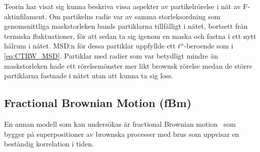\begin{comment}
Positionsändringen och väntetiden beskrivs av två oberoende stokastiska variabler. 
MSD för denna typ av rörelse blir\cite{Barkai_MSDCTRW2007}
\begin{equation}
    \ev{x^2(t)} \approx \frac{\ev{\Delta x^2}}{A \Gamma(1+\alpha)}t^{\alpha} + \frac{2\ev{\Delta x}^2}{\Gamma(1+2\alpha)A^2} t^{2\alpha}, 
\end{equation}
där $A$ är en konstant som dyker upp i fördelningsfunktionen för väntetiderna, $\Gamma$ är gammafunktionen, $\alpha$ en konstant som uppfyller $0<\alpha<1$ och $\Delta x$ steget mellan två positioner. Om $\ev{\Delta x}=0 $ försvinner andra termen och rörelsens MSD blir proportionell mot $t^\alpha$. Eftersom $\alpha < 1$ blir MSD:n inte linjär i tiden, utan ändringstakten kommer att avta med tiden och rörelsen skiljer sig från den klassiska brownska rörelsen.
\end{comment}

Teorin har visat sig kunna beskriva vissa aspekter av partikelrörelse i nät av F-aktinfilament\cite{Barkai_CTRW}. Om partikelns radie var av samma storleksordning som genomsnittliga maskstorleken bands partiklarna tillfälligt i nätet, bortsett från termiska fluktuationer, för att sedan ta sig igenom en maska och fastna i ett nytt hålrum i nätet. MSD:n för dessa partiklar uppfyllde ett $t^{\alpha}$-beroende som i \eqref{eq:CTRW_MSD}. Partiklar med radier som var betydligt mindre än maskstorleken hade ett rörelsemönster mer likt brownsk rörelse medan de större partiklarna fastnade i nätet utan att kunna ta sig loss.



\subsection{Fractional Brownian Motion (fBm)}

En annan modell som kan undersökas är fractional Brownian motion~\cite{Mandelbrot_fBm1968} som bygger på superpositioner av brownska processer med brus som uppvisar en beständig korrelation i tiden. 

